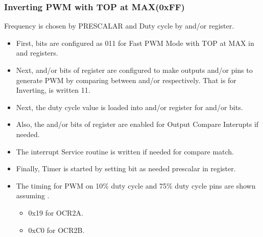 \documentclass{article}
\begin{document}
\subsubsection{Inverting PWM with TOP at MAX(0xFF)}
\quad Frequency is chosen by PRESCALAR and Duty cycle by  and/or  register.
\begin{itemize}
    \item First,  bits are configured as 011 for Fast PWM Mode with TOP at MAX in  and  registers.
    \item Next,  and/or  bits of  register are configured to make outputs  and/or  pins to generate PWM by comparing between  and/or  respectively. That is for Inverting,  is written 11.
    \item Next, the duty cycle value is loaded into  and/or  register for  and/or  bits.
    \item Also, the  and/or  bits of  register  are enabled for Output Compare Interupts if needed.
    \item The interrupt Service routine is written if needed for compare match.
    \item Finally, Timer is started by setting  bit as needed prescalar in  register.
    \item The timing for PWM on 10\% duty cycle  and 75\% duty cycle  pins are shown assuming .
    \begin{itemize}
        \item 0x19 for OCR2A.
        \item 0xC0 for OCR2B.
    \end{itemize}
\end{itemize}
\end{document}
